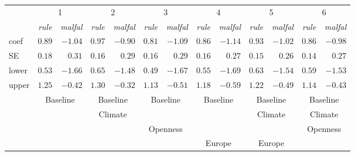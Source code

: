 \begin{tabular}{lrrrrrrrrrrrr}
\hline \hline 
& \multicolumn{2}{c}{1} & \multicolumn{2}{c}{2} & \multicolumn{2}{c}{3} & \multicolumn{2}{c}{4} & \multicolumn{2}{c}{5} & \multicolumn{2}{c}{6}\\ 
& \multicolumn{1}{c}{\emph{rule}} & \multicolumn{1}{c}{\emph{malfal}} & \multicolumn{1}{c}{\emph{rule}} & \multicolumn{1}{c}{\emph{malfal}} & \multicolumn{1}{c}{\emph{rule}} & \multicolumn{1}{c}{\emph{malfal}} & \multicolumn{1}{c}{\emph{rule}} & \multicolumn{1}{c}{\emph{malfal}} & \multicolumn{1}{c}{\emph{rule}} & \multicolumn{1}{c}{\emph{malfal}} & \multicolumn{1}{c}{\emph{rule}} & \multicolumn{1}{c}{\emph{malfal}}\\ 
 \hline 
 
coef & $0.89$ & $-1.04$ & $0.97$ & $-0.90$ & $0.81$ & $-1.09$ & $0.86$ & $-1.14$ & $0.93$ & $-1.02$ & $0.86$ & $-0.98$\\ 
SE & $0.18$ & $0.31$ & $0.16$ & $0.29$ & $0.16$ & $0.29$ & $0.16$ & $0.27$ & $0.15$ & $0.26$ & $0.14$ & $0.27$\\ 
lower & $0.53$ & $-1.66$ & $0.65$ & $-1.48$ & $0.49$ & $-1.67$ & $0.55$ & $-1.69$ & $0.63$ & $-1.54$ & $0.59$ & $-1.53$\\ 
upper & $1.25$ & $-0.42$ & $1.30$ & $-0.32$ & $1.13$ & $-0.51$ & $1.18$ & $-0.59$ & $1.22$ & $-0.49$ & $1.14$ & $-0.43$\\ 
& \multicolumn{2}{c}{Baseline} & \multicolumn{2}{c}{Baseline} & \multicolumn{2}{c}{Baseline} & \multicolumn{2}{c}{Baseline} & \multicolumn{2}{c}{Baseline} & \multicolumn{2}{c}{Baseline}\\ 
& \multicolumn{2}{c}{} & \multicolumn{2}{c}{Climate} & \multicolumn{2}{c}{} & \multicolumn{2}{c}{} & \multicolumn{2}{c}{Climate} & \multicolumn{2}{c}{Climate}\\ 
& \multicolumn{2}{c}{} & \multicolumn{2}{c}{} & \multicolumn{2}{c}{Openness} & \multicolumn{2}{c}{} & \multicolumn{2}{c}{} & \multicolumn{2}{c}{Openness}\\ 
& \multicolumn{2}{c}{} & \multicolumn{2}{c}{} & \multicolumn{2}{c}{} & \multicolumn{2}{c}{Europe} & \multicolumn{2}{c}{Europe} & \multicolumn{2}{c}{}\\ 
 \hline
\end{tabular} 
